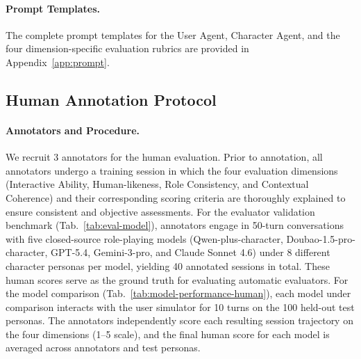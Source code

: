 \paragraph{Prompt Templates.}
The complete prompt templates for the User Agent, Character Agent, and the four dimension-specific evaluation rubrics are provided in Appendix~\ref{app:prompt}.


\subsection{Human Annotation Protocol}
\label{app:human_annotation}

\paragraph{Annotators and Procedure.}
We recruit 3 annotators for the human evaluation. Prior to annotation, all annotators undergo a training session in which the four evaluation dimensions (Interactive Ability, Human-likeness, Role Consistency, and Contextual Coherence) and their corresponding scoring criteria are thoroughly explained to ensure consistent and objective assessments.
For the evaluator validation benchmark (Tab.~\ref{tab:eval-model}), annotators engage in 50-turn conversations with five closed-source role-playing models (Qwen-plus-character, Doubao-1.5-pro-character, GPT-5.4, Gemini-3-pro, and Claude Sonnet 4.6) under 8 different character personas per model, yielding 40 annotated sessions in total. These human scores serve as the ground truth for evaluating automatic evaluators.
For the model comparison (Tab.~\ref{tab:model-performance-human}), each model under comparison interacts with the user simulator for 10 turns on the 100 held-out test personas. The annotators independently score each resulting session trajectory on the four dimensions (1--5 scale), and the final human score for each model is averaged across annotators and test personas.

\begin{table}[t!]
\centering
\caption{Statistics of different models including Mean, Standard Deviation, Range, and Coefficient of Variation.}
\label{table:stability_analysis}
\end{table}

